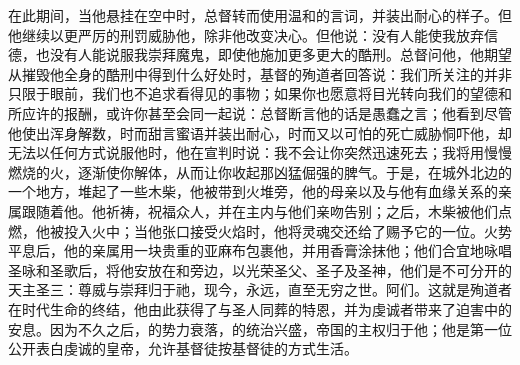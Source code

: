 在此期间，当他悬挂在空中时，总督转而使用温和的言词，并装出耐心的样子。但他继续以更严厉的刑罚威胁他，除非他改变决心。但他说：没有人能使我放弃信德，也没有人能说服我崇拜魔鬼，即使他施加更多更大的酷刑。总督问他，他期望从摧毁他全身的酷刑中得到什么好处时，基督的殉道者回答说：我们所关注的并非只限于眼前，我们也不追求看得见的事物；如果你也愿意将目光转向我们的望德和所应许的报酬，或许你甚至会同一起说：总督断言他的话是愚蠢之言；他看到尽管他使出浑身解数，时而甜言蜜语并装出耐心，时而又以可怕的死亡威胁恫吓他，却无法以任何方式说服他时，他在宣判时说：我不会让你突然迅速死去；我将用慢慢燃烧的火，逐渐使你解体，从而让你收起那凶猛倔强的脾气。于是，在城外北边的一个地方，堆起了一些木柴，他被带到火堆旁，他的母亲以及与他有血缘关系的亲属跟随着他。他祈祷，祝福众人，并在主内与他们亲吻告别；之后，木柴被他们点燃，他被投入火中；当他张口接受火焰时，他将灵魂交还给了赐予它的一位。火势平息后，他的亲属用一块贵重的亚麻布包裹他，并用香膏涂抹他；他们合宜地咏唱圣咏和圣歌后，将他安放在和旁边，以光荣圣父、圣子及圣神，他们是不可分开的天主圣三：尊威与崇拜归于祂，现今，永远，直至无穷之世。阿们。这就是殉道者在时代生命的终结，他由此获得了与圣人同葬的特恩，并为虔诚者带来了迫害中的安息。因为不久之后，的势力衰落，的统治兴盛，帝国的主权归于他；他是第一位公开表白虔诚的皇帝，允许基督徒按基督徒的方式生活。\par


